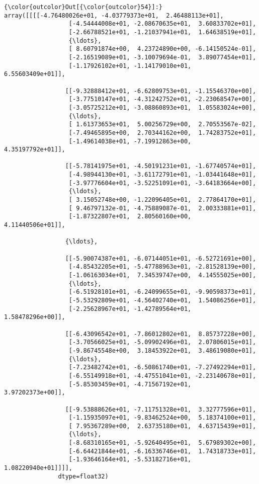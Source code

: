 \documentclass[11pt]{article}
\begin{document}
\begin{Verbatim}[commandchars=\\\{\}]
{\color{outcolor}Out[{\color{outcolor}54}]:} array([[[[-4.76480026e+01, -4.03779373e+01,  2.46488113e+01],
                  [-4.54444008e+01, -2.08670635e+01,  3.60833702e+01],
                  [-2.66788521e+01, -1.21037941e+01,  1.64638519e+01],
                  {\ldots},
                  [ 8.60791874e+00,  4.23724890e+00, -6.14150524e-01],
                  [-2.16519089e+01, -3.10079694e-01,  3.89077454e+01],
                  [-1.17926102e+01, -1.14179010e+01,  6.55603409e+01]],
         
                 [[-9.32888412e+01, -6.62809753e+01, -1.15546370e+00],
                  [-3.77510147e+01, -4.31242752e+01, -2.23068547e+00],
                  [-3.05725212e+01, -3.08860893e+01,  1.05583024e+00],
                  {\ldots},
                  [ 1.61373653e+01,  5.00256729e+00,  2.70553567e-02],
                  [-7.49465895e+00,  2.70344162e+00,  1.74283752e+01],
                  [-1.49614038e+01, -7.19912863e+00,  4.35197792e+01]],
         
                 [[-5.78141975e+01, -4.50191231e+01, -1.67740574e+01],
                  [-4.98944130e+01, -3.61172791e+01, -1.03441648e+01],
                  [-3.97776604e+01, -3.52251091e+01, -3.64183664e+00],
                  {\ldots},
                  [ 3.15052748e+00, -1.22096405e+01,  2.77864170e+01],
                  [ 9.46797132e-01, -4.75889087e-01,  2.00333881e+01],
                  [-1.87322807e+01,  2.80560160e+00,  4.11440506e+01]],
         
                 {\ldots},
         
                 [[-5.90074387e+01, -6.07144051e+01, -6.52721691e+00],
                  [-4.85432205e+01, -5.47788963e+01, -2.81528139e+00],
                  [-1.06163034e+01,  7.34539747e+00,  4.14555025e+00],
                  {\ldots},
                  [-6.51928101e+01, -6.24099655e+01, -9.90598373e+01],
                  [-5.53292809e+01, -4.56402740e+01,  1.54086256e+01],
                  [-2.25628967e+01, -1.42789564e+01,  1.58478296e+00]],
         
                 [[-6.43096542e+01, -7.86012802e+01,  8.85737228e+00],
                  [-3.70566025e+01, -5.09902496e+01,  2.07806015e+01],
                  [-9.86745548e+00,  3.18453922e+01,  3.48619080e+01],
                  {\ldots},
                  [-7.23482742e+01, -6.50861740e+01, -7.27492294e+01],
                  [-6.55149918e+01, -4.47551041e+01, -2.23140678e+01],
                  [-5.85303459e+01, -4.71567192e+01,  3.97202373e+00]],
         
                 [[-9.53888626e+01, -7.11751328e+01,  3.32777596e+01],
                  [-1.15935097e+01, -9.83462524e+00,  5.18374100e+01],
                  [ 7.95367289e+00,  2.63735180e+01,  4.63715439e+01],
                  {\ldots},
                  [-8.68310165e+01, -5.92640495e+01,  5.67989302e+00],
                  [-6.64421844e+01, -6.16336746e+01,  1.74318733e+01],
                  [-1.93646164e+01, -5.53182716e+01,  1.08220940e+01]]]],
               dtype=float32)
\end{Verbatim}
            
\end{document}
